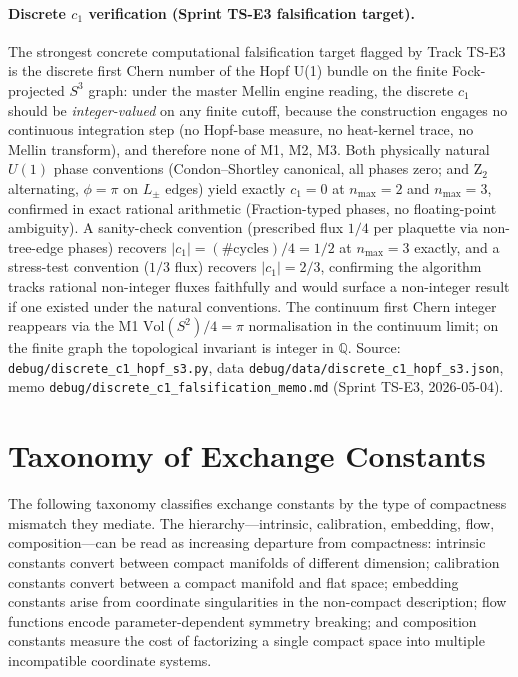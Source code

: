 \documentclass[aps,pra,twocolumn,superscriptaddress,longbibliography]{revtex4-2}
\begin{document}
\paragraph{Discrete $c_1$ verification (Sprint TS-E3 falsification target).}
The strongest concrete computational falsification target flagged by Track
TS-E3 is the discrete first Chern number of the Hopf U(1) bundle on the
finite Fock-projected $S^3$ graph: under the master Mellin engine reading,
the discrete $c_1$ should be \emph{integer-valued} on any finite cutoff,
because the construction engages no continuous integration step (no
Hopf-base measure, no heat-kernel trace, no Mellin transform), and
therefore none of M1, M2, M3.  Both physically natural $U(1)$
phase conventions (Condon--Shortley canonical, all phases zero; and Z$_2$
alternating, $\phi = \pi$ on $L_\pm$ edges) yield exactly $c_1 = 0$ at
$n_{\max} = 2$ and $n_{\max} = 3$, confirmed in exact rational arithmetic
(Fraction-typed phases, no floating-point ambiguity).  A sanity-check
convention (prescribed flux $1/4$ per plaquette via non-tree-edge phases)
recovers $|c_1| = (\#\text{cycles}) / 4 = 1/2$ at $n_{\max} = 3$ exactly,
and a stress-test convention ($1/3$ flux) recovers $|c_1| = 2/3$,
confirming the algorithm tracks rational non-integer fluxes faithfully
and would surface a non-integer result if one existed under the natural
conventions.  The continuum first Chern integer reappears via the M1
$\mathrm{Vol}(S^2)/4 = \pi$ normalisation in the continuum limit; on the
finite graph the topological invariant is integer in $\mathbb{Q}$.  Source:
\verb|debug/discrete_c1_hopf_s3.py|, data \verb|debug/data/discrete_c1_hopf_s3.json|,
memo \verb|debug/discrete_c1_falsification_memo.md| (Sprint TS-E3, 2026-05-04).



\section{Taxonomy of Exchange Constants}
\label{sec:taxonomy}

The following taxonomy classifies exchange constants by the type of
compactness mismatch they mediate.  The hierarchy---intrinsic,
calibration, embedding, flow, composition---can be read as increasing
departure from compactness: intrinsic constants convert between
compact manifolds of different dimension; calibration constants convert
between a compact manifold and flat space; embedding constants arise
from coordinate singularities in the non-compact description;
flow functions encode parameter-dependent symmetry breaking; and
composition constants measure the cost of factorizing a single compact
space into multiple incompatible coordinate systems.
\end{document}
